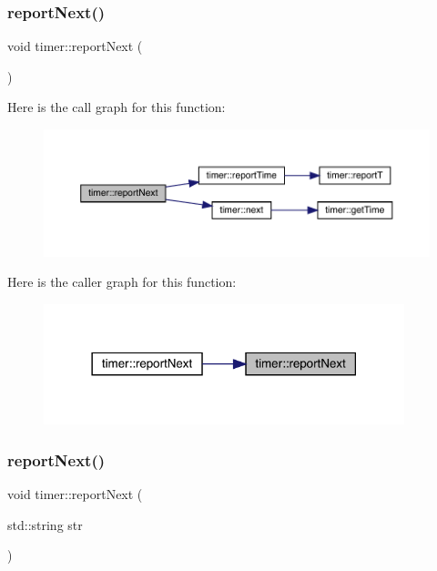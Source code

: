 \subsubsection{\texorpdfstring{reportNext()}{reportNext()}\hspace{0.1cm}{\footnotesize\ttfamily [1/2]}}
{\footnotesize\ttfamily void timer\+::report\+Next (\begin{DoxyParamCaption}{ }\end{DoxyParamCaption})\hspace{0.3cm}{\ttfamily [inline]}}

Here is the call graph for this function\+:\nopagebreak
\begin{figure}[H]
\begin{center}
\leavevmode
\includegraphics[width=350pt]{structtimer_a8d9f92edc40c64921b36cc8d1ef5f5a5_cgraph}
\end{center}
\end{figure}
Here is the caller graph for this function\+:\nopagebreak
\begin{figure}[H]
\begin{center}
\leavevmode
\includegraphics[width=297pt]{structtimer_a8d9f92edc40c64921b36cc8d1ef5f5a5_icgraph}
\end{center}
\end{figure}
\mbox{\label{structtimer_a7b1a86c7ecf45b606632f959ac4cd51e}} 
\subsubsection{\texorpdfstring{reportNext()}{reportNext()}\hspace{0.1cm}{\footnotesize\ttfamily [2/2]}}
{\footnotesize\ttfamily void timer\+::report\+Next (\begin{DoxyParamCaption}\item[{std\+::string}]{str }\end{DoxyParamCaption})\hspace{0.3cm}{\ttfamily [inline]}}

